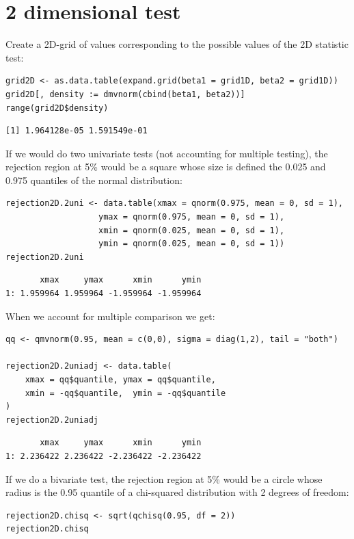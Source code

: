 \documentclass[12pt]{article}
\begin{document}
\section{2 dimensional test}
\label{sec:org078e43f}

Create a 2D-grid of values corresponding to the possible values of the 2D statistic test:
\lstset{language=r,label= ,caption= ,captionpos=b,numbers=none}
\begin{lstlisting}
grid2D <- as.data.table(expand.grid(beta1 = grid1D, beta2 = grid1D))
grid2D[, density := dmvnorm(cbind(beta1, beta2))]
range(grid2D$density)
\end{lstlisting}

\begin{verbatim}
[1] 1.964128e-05 1.591549e-01
\end{verbatim}

If we would do two univariate tests (not accounting for multiple
testing), the rejection region at 5\% would be a square whose size is
defined the 0.025 and 0.975 quantiles of the normal distribution:
\lstset{language=r,label= ,caption= ,captionpos=b,numbers=none}
\begin{lstlisting}
rejection2D.2uni <- data.table(xmax = qnorm(0.975, mean = 0, sd = 1),
			       ymax = qnorm(0.975, mean = 0, sd = 1),
			       xmin = qnorm(0.025, mean = 0, sd = 1),
			       ymin = qnorm(0.025, mean = 0, sd = 1))
rejection2D.2uni
\end{lstlisting}

\begin{verbatim}
       xmax     ymax      xmin      ymin
1: 1.959964 1.959964 -1.959964 -1.959964
\end{verbatim}

When we account for multiple comparison we get:
\lstset{language=r,label= ,caption= ,captionpos=b,numbers=none}
\begin{lstlisting}
qq <- qmvnorm(0.95, mean = c(0,0), sigma = diag(1,2), tail = "both")

rejection2D.2uniadj <- data.table(
    xmax = qq$quantile, ymax = qq$quantile,
    xmin = -qq$quantile,  ymin = -qq$quantile
)
rejection2D.2uniadj
\end{lstlisting}

\begin{verbatim}
       xmax     ymax      xmin      ymin
1: 2.236422 2.236422 -2.236422 -2.236422
\end{verbatim}

If we do a bivariate test, the rejection region at 5\% would be a
circle whose radius is the 0.95 quantile of a chi-squared distribution
with 2 degrees of freedom:
\lstset{language=r,label= ,caption= ,captionpos=b,numbers=none}
\begin{lstlisting}
rejection2D.chisq <- sqrt(qchisq(0.95, df = 2))
rejection2D.chisq
\end{lstlisting}
\end{document}
